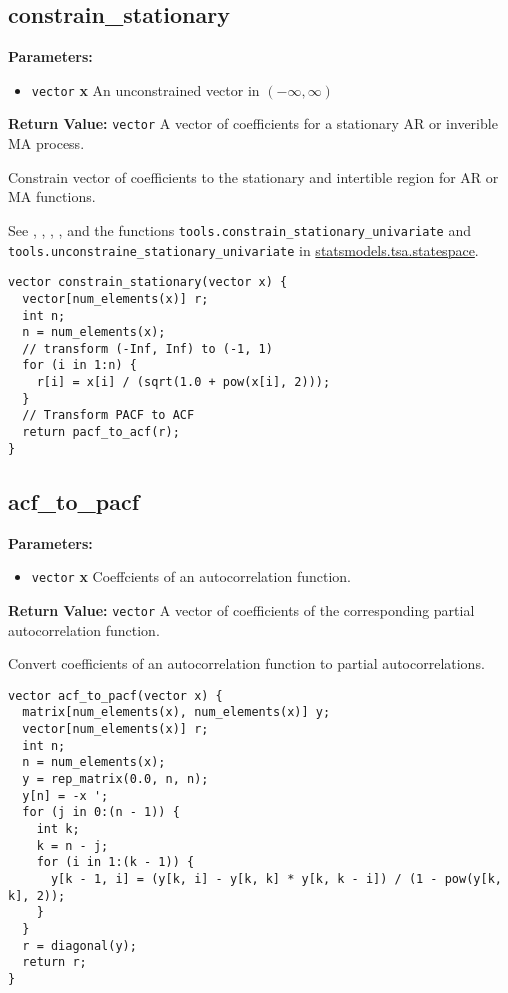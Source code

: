 \documentclass[]{book}
\providecommand{\tightlist}{%
  \setlength{\itemsep}{0pt}\setlength{\parskip}{0pt}}
\begin{document}
\subsection{constrain\_stationary}\label{constrainux5fstationary}

\textbf{Parameters:}

\begin{itemize}
\tightlist
\item
  \texttt{vector} \textbf{x} An unconstrained vector in
  \((-\infty, \infty)\)
\end{itemize}

\textbf{Return Value:} \texttt{vector} A vector of coefficients for a
stationary AR or inverible MA process.

Constrain vector of coefficients to the stationary and intertible region
for AR or MA functions.

See \textcite{Jones1980a}, \textcite{Jones1987a},
\textcite{Monahan1984a}, \textcite{AnsleyKohn1986a}, and the functions
\texttt{tools.constrain\_stationary\_univariate} and
\texttt{tools.unconstraine\_stationary\_univariate} in
\href{http://www.statsmodels.org/dev/statespace.html\#statespace-tools}{statsmodels.tsa.statespace}.

\begin{verbatim}
vector constrain_stationary(vector x) {
  vector[num_elements(x)] r;
  int n;
  n = num_elements(x);
  // transform (-Inf, Inf) to (-1, 1)
  for (i in 1:n) {
    r[i] = x[i] / (sqrt(1.0 + pow(x[i], 2)));
  }
  // Transform PACF to ACF
  return pacf_to_acf(r);
}
\end{verbatim}

\subsection{acf\_to\_pacf}\label{acfux5ftoux5fpacf}

\textbf{Parameters:}

\begin{itemize}
\tightlist
\item
  \texttt{vector} \textbf{x} Coeffcients of an autocorrelation function.
\end{itemize}

\textbf{Return Value:} \texttt{vector} A vector of coefficients of the
corresponding partial autocorrelation function.

Convert coefficients of an autocorrelation function to partial
autocorrelations.

\begin{verbatim}
vector acf_to_pacf(vector x) {
  matrix[num_elements(x), num_elements(x)] y;
  vector[num_elements(x)] r;
  int n;
  n = num_elements(x);
  y = rep_matrix(0.0, n, n);
  y[n] = -x ';
  for (j in 0:(n - 1)) {
    int k;
    k = n - j;
    for (i in 1:(k - 1)) {
      y[k - 1, i] = (y[k, i] - y[k, k] * y[k, k - i]) / (1 - pow(y[k, k], 2));
    }
  }
  r = diagonal(y);
  return r;
}
\end{verbatim}
\end{document}
